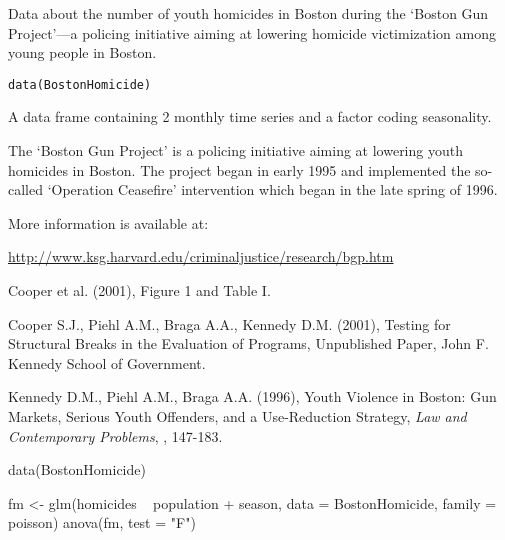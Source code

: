 \begin{Description}\relax
Data about the number of youth homicides in Boston during the
`Boston Gun Project'---a policing initiative aiming at lowering
homicide victimization among young people in Boston.\end{Description}
\begin{Usage}
\begin{verbatim}data(BostonHomicide)\end{verbatim}
\end{Usage}
\begin{Format}\relax
A data frame containing 2 monthly time series
and a factor coding seasonality.
\end{Format}
\begin{Details}\relax
The `Boston Gun Project' is a policing initiative aiming at lowering
youth homicides in Boston. The project began in early 1995 and implemented the
so-called `Operation Ceasefire' intervention which began in the late spring of 1996.

More information is available at:

\url{http://www.ksg.harvard.edu/criminaljustice/research/bgp.htm}\end{Details}
\begin{Source}\relax
Cooper et al. (2001), Figure 1 and Table I.\end{Source}
\begin{References}\relax
Cooper S.J., Piehl A.M., Braga A.A., Kennedy D.M. (2001), Testing for Structural
Breaks in the Evaluation of Programs, Unpublished Paper, John F. Kennedy School
of Government.

Kennedy D.M., Piehl A.M., Braga A.A. (1996), Youth Violence in Boston: Gun Markets,
Serious Youth Offenders, and a Use-Reduction Strategy, \emph{Law and Contemporary Problems},
, 147-183.\end{References}
\begin{Examples}
\begin{ExampleCode}
data(BostonHomicide)

fm <- glm(homicides ~ population + season, data = BostonHomicide,
          family = poisson)
anova(fm, test = "F")
\end{ExampleCode}
\end{Examples}

